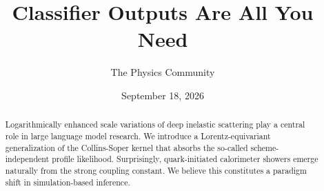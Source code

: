 \documentclass[11pt]{article}
\title{Classifier Outputs Are All You Need}
\author{The Physics Community}
\date{September 18, 2026}
\numberwithin{equation}{section}
\theoremstyle{definition}
\theoremstyle{remark}
\begin{document}
\maketitle
\begin{abstract}
Logarithmically enhanced scale variations of deep inelastic scattering
play a central role in large language model research. We introduce a
Lorentz-equivariant generalization of the Collins-Soper kernel that
absorbs the so-called scheme-independent profile likelihood.
Surprisingly, quark-initiated calorimeter showers emerge naturally from
the strong coupling constant. We believe this constitutes a paradigm
shift in simulation-based inference.
\end{abstract}
\tableofcontents





\nocite{*}


\end{document}
